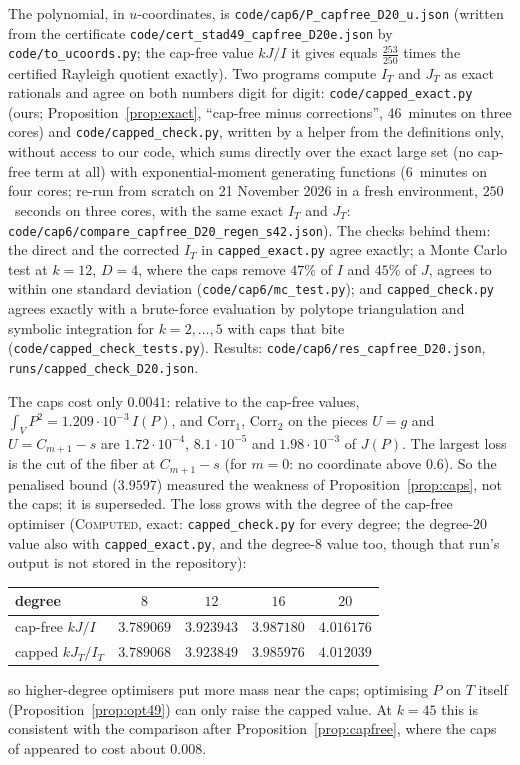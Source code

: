\documentclass[11pt]{amsart}
\theoremstyle{definition}
\theoremstyle{remark}
\newcommand{\lbl}[1]{\textup{\textsc{#1}}}
\begin{document}
\begin{sloppypar}
The polynomial, in $u$-coordinates, is \texttt{code/cap6/P\_capfree\_D20\_u.json}
(written from the certificate \texttt{code/cert\_stad49\_capfree\_D20e.json} by
\texttt{code/to\_ucoords.py}; the cap-free value $kJ/I$ it gives equals
$\frac{253}{250}$ times the certified Rayleigh quotient exactly). Two programs
compute $I_T$ and $J_T$ as exact rationals and agree on both numbers digit for
digit: \texttt{code/capped\_exact.py} (ours; Proposition~\ref{prop:exact},
``cap-free minus corrections'', 46~minutes on three cores) and
\texttt{code/capped\_check.py}, written by a helper from the definitions only,
without access to our code, which sums directly over the exact large set
(no cap-free term at all) with exponential-moment generating functions
($6$~minutes on four cores; re-run from scratch on 21 November 2026 in a fresh
environment, $250$~seconds on three cores, with the same exact $I_T$ and $J_T$:
\texttt{code/cap6/compare\_capfree\_D20\_regen\_s42.json}). The checks behind them: the direct and the
corrected $I_T$ in \texttt{capped\_exact.py} agree exactly; a Monte Carlo
test at $k=12$, $D=4$, where the caps remove $47\%$ of $I$ and $45\%$ of $J$,
agrees to within one standard deviation
(\texttt{code/cap6/mc\_test.py}); and \texttt{capped\_check.py} agrees exactly
with a brute-force evaluation by polytope triangulation and symbolic
integration for $k=2,\dots,5$ with caps that bite
(\texttt{code/capped\_check\_tests.py}). Results:
\texttt{code/cap6/res\_capfree\_D20.json}, \texttt{runs/capped\_check\_D20.json}.
\end{sloppypar}

The caps cost only $0.0041$: relative to the cap-free values,
$\int_VP^2=1.209\cdot10^{-3}\,I(P)$, and $\mathrm{Corr}_1$,
$\mathrm{Corr}_2$ on the pieces $U=g$ and $U=C_{m+1}-s$ are
$1.72\cdot10^{-4}$, $8.1\cdot10^{-5}$ and $1.98\cdot10^{-3}$ of $J(P)$. The
largest loss is the cut of the fiber at $C_{m+1}-s$ (for $m=0$: no coordinate
above $0.6$). So the penalised bound ($3.9597$) measured the
weakness of Proposition~\ref{prop:caps}, not the caps; it is superseded. The loss grows with the degree of the cap-free optimiser
(\lbl{Computed}, exact: \texttt{capped\_check.py} for every degree; the
degree-$20$ value also with \texttt{capped\_exact.py}, and the degree-$8$ value
too, though that run's output is not stored in the repository):
\begin{center}
\begin{tabular}{@{}lcccc@{}}
\toprule
degree & $8$ & $12$ & $16$ & $20$\\
\midrule
cap-free $kJ/I$ & $3.789069$ & $3.923943$ & $3.987180$ & $4.016176$\\
capped $kJ_T/I_T$ & $3.789068$ & $3.923849$ & $3.985976$ & $4.012039$\\
\bottomrule
\end{tabular}
\end{center}
so higher-degree optimisers put more mass near the caps; optimising $P$ on
$T$ itself (Proposition~\ref{prop:opt49}) can only raise
the capped value.
At $k=45$ this is consistent with the comparison after
Proposition~\ref{prop:capfree}, where the caps of \cite{Cha26} appeared to
cost about $0.008$.
\end{document}
